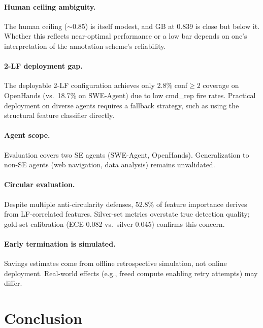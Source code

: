\documentclass[11pt,a4paper]{article}
\begin{document}
\paragraph{Human ceiling ambiguity.}
The human ceiling (${\sim}$0.85) is itself modest, and GB at 0.839 is close but below it. Whether this reflects near-optimal performance or a low bar depends on one's interpretation of the annotation scheme's reliability.

\paragraph{2-LF deployment gap.}
The deployable 2-LF configuration achieves only 2.8\% conf${\geq}$2 coverage on OpenHands (vs.\ 18.7\% on SWE-Agent) due to low cmd\_rep fire rates. Practical deployment on diverse agents requires a fallback strategy, such as using the structural feature classifier directly.

\paragraph{Agent scope.}
Evaluation covers two SE agents (SWE-Agent, OpenHands). Generalization to non-SE agents (web navigation, data analysis) remains unvalidated.

\paragraph{Circular evaluation.}
Despite multiple anti-circularity defenses, 52.8\% of feature importance derives from LF-correlated features. Silver-set metrics overstate true detection quality; gold-set calibration (ECE 0.082 vs.\ silver 0.045) confirms this concern.

\paragraph{Early termination is simulated.}
Savings estimates come from offline retrospective simulation, not online deployment. Real-world effects (e.g., freed compute enabling retry attempts) may differ.

\section{Conclusion}
\end{document}
